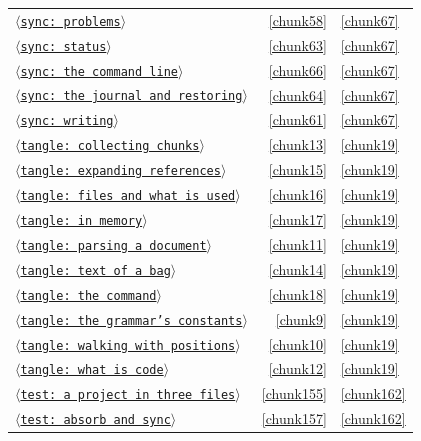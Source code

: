 \documentclass[10pt,a4paper]{article}
\newcounter{chunk}
\newcommand{\chunkname}[1]{\ensuremath{\langle}\texttt{#1}\ensuremath{\rangle}}
\begin{document}
\begin{longtable}{@{}p{}rp{}@{}}
\hyperref[chunk58]{\chunkname{sync: problems}} & \ref*{chunk58} & \hyperref[chunk67]{\ref*{chunk67}} \\
\hyperref[chunk63]{\chunkname{sync: status}} & \ref*{chunk63} & \hyperref[chunk67]{\ref*{chunk67}} \\
\hyperref[chunk66]{\chunkname{sync: the command line}} & \ref*{chunk66} & \hyperref[chunk67]{\ref*{chunk67}} \\
\hyperref[chunk64]{\chunkname{sync: the journal and restoring}} & \ref*{chunk64} & \hyperref[chunk67]{\ref*{chunk67}} \\
\hyperref[chunk61]{\chunkname{sync: writing}} & \ref*{chunk61} & \hyperref[chunk67]{\ref*{chunk67}} \\
\hyperref[chunk13]{\chunkname{tangle: collecting chunks}} & \ref*{chunk13} & \hyperref[chunk19]{\ref*{chunk19}} \\
\hyperref[chunk15]{\chunkname{tangle: expanding references}} & \ref*{chunk15} & \hyperref[chunk19]{\ref*{chunk19}} \\
\hyperref[chunk16]{\chunkname{tangle: files and what is used}} & \ref*{chunk16} & \hyperref[chunk19]{\ref*{chunk19}} \\
\hyperref[chunk17]{\chunkname{tangle: in memory}} & \ref*{chunk17} & \hyperref[chunk19]{\ref*{chunk19}} \\
\hyperref[chunk11]{\chunkname{tangle: parsing a document}} & \ref*{chunk11} & \hyperref[chunk19]{\ref*{chunk19}} \\
\hyperref[chunk14]{\chunkname{tangle: text of a bag}} & \ref*{chunk14} & \hyperref[chunk19]{\ref*{chunk19}} \\
\hyperref[chunk18]{\chunkname{tangle: the command}} & \ref*{chunk18} & \hyperref[chunk19]{\ref*{chunk19}} \\
\hyperref[chunk9]{\chunkname{tangle: the grammar's constants}} & \ref*{chunk9} & \hyperref[chunk19]{\ref*{chunk19}} \\
\hyperref[chunk10]{\chunkname{tangle: walking with positions}} & \ref*{chunk10} & \hyperref[chunk19]{\ref*{chunk19}} \\
\hyperref[chunk12]{\chunkname{tangle: what is code}} & \ref*{chunk12} & \hyperref[chunk19]{\ref*{chunk19}} \\
\hyperref[chunk155]{\chunkname{test: a project in three files}} & \ref*{chunk155} & \hyperref[chunk162]{\ref*{chunk162}} \\
\hyperref[chunk157]{\chunkname{test: absorb and sync}} & \ref*{chunk157} & \hyperref[chunk162]{\ref*{chunk162}} \\

\end{longtable}
\end{document}
